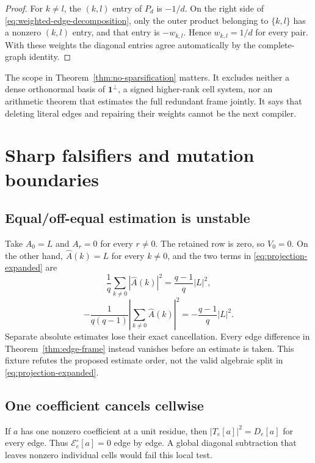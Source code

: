 \documentclass[11pt]{article}
\newcommand{\one}{\mathbf 1}
\newcommand{\cE}{\mathcal E}
\begin{document}
\begin{proof}
For $k\ne l$, the $(k,l)$ entry of $P_d$ is $-1/d$.  On the right side of
\eqref{eq:weighted-edge-decomposition}, only the outer product belonging to
$\{k,l\}$ has a nonzero $(k,l)$ entry, and that entry is $-w_{k,l}$.  Hence
$w_{k,l}=1/d$ for every pair.  With these weights the diagonal entries agree
automatically by the complete-graph identity.
\end{proof}

The scope in Theorem~\ref{thm:no-sparsification} matters.  It excludes neither
a dense orthonormal basis of $\one^\perp$, a signed higher-rank cell system,
nor an arithmetic theorem that estimates the full redundant frame jointly.
It says that deleting literal edges and repairing their weights cannot be the
next compiler.

\section{Sharp falsifiers and mutation boundaries}

\subsection{Equal/off-equal estimation is unstable}

Take $A_0=L$ and $A_r=0$ for every $r\ne0$.  The retained row is zero, so
$V_0=0$.  On the other hand, $\widehat A(k)=L$ for every $k\ne0$, and the two
terms in \eqref{eq:projection-expanded} are
\begin{equation}\label{eq:spike-equal}
 \frac1q\sum_{k\ne0}|\widehat A(k)|^2
 =\frac{q-1}{q}|L|^2,
\end{equation}
\begin{equation}\label{eq:spike-off-equal}
 -\frac1{q(q-1)}\left|\sum_{k\ne0}\widehat A(k)\right|^2
 =-\frac{q-1}{q}|L|^2.
\end{equation}
Separate absolute estimates lose their exact cancellation.  Every edge
difference in Theorem~\ref{thm:edge-frame} instead vanishes before an estimate
is taken.  This fixture refutes the proposed estimate order, not the valid
algebraic split in \eqref{eq:projection-expanded}.

\subsection{One coefficient cancels cellwise}

If $a$ has one nonzero coefficient at a unit residue, then
$|T_e[a]|^2=D_e[a]$ for every edge.  Thus
$\cE_e^\circ[a]=0$ edge by edge.  A global diagonal subtraction that leaves
nonzero individual cells would fail this local test.
\end{document}
